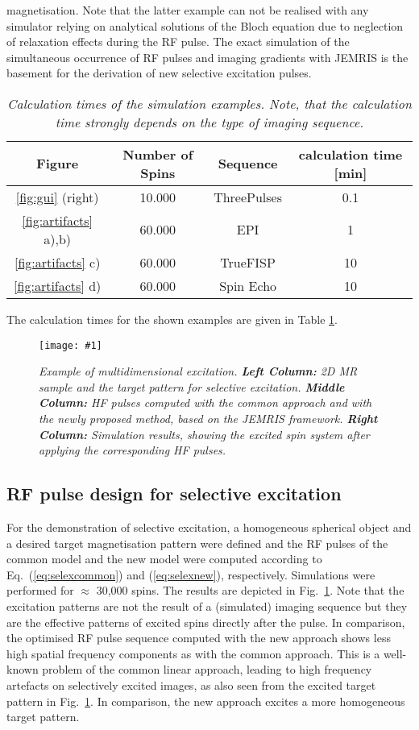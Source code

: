 \documentclass{nic-series}
\newcommand{\epsfigure}[5]{
 \begin{figure}[#4!]
   \begin{center}
    \texttt{[image: \#1]}
    \caption{{\sl #2}\label{#3}}
   \end{center}
 \end{figure}}
\begin{document}
magnetisation. Note that the latter example can not be realised with any simulator relying on analytical solutions of the Bloch
equation due to neglection of relaxation effects during the RF pulse. The exact simulation of the simultaneous occurrence of RF
pulses and imaging gradients with JEMRIS is the basement for the derivation of new selective excitation pulses.
\begin{small}
 \begin{table}[tp]
  {\footnotesize
  \begin{center}
  \begin{tabular}{|c|c|c|c|}
  \hline
        Figure & Number of Spins & Sequence & calculation time [min] \\
  \hline
	\ref{fig:gui} (right)    & 10.000     & ThreePulses & 0.1 \\
	\ref{fig:artifacts} a),b)& 60.000     & EPI         & 1 \\
	\ref{fig:artifacts} c)   & 60.000     & TrueFISP    & 10 \\
	\ref{fig:artifacts} d)   & 60.000     & Spin Echo   & 10 \\
  \hline
  \end{tabular}
  \end{center}
  }
  \caption{\label{tab:calctimes}
           {\it Calculation times of the simulation examples. Note, that the calculation time strongly depends
		on the type of imaging sequence.}}
 \end{table}
\end{small}
The calculation times for the shown examples are given in Table \ref{tab:calctimes}.
\epsfigure{fig/Selex.eps}{Example of multidimensional excitation. {\bf Left Column:} 2D MR sample and the target pattern for selective
			     excitation. {\bf Middle Column:} HF pulses computed with the common approach and with the newly proposed method,
			     based on the JEMRIS framework. {\bf Right Column:} Simulation results, showing the excited spin
			     system after applying the corresponding HF pulses.}{fig:selex}{bp}{0.7}
\subsection{RF pulse design for selective excitation}
For the demonstration of selective excitation, a homogeneous spherical object and a desired target
magnetisation pattern were defined and the RF pulses of the common model and the new model were computed
according to Eq.~(\ref{eq:selexcommon}) and (\ref{eq:selexnew}), respectively. Simulations were performed for $\approx$ 30,000 spins.
The results are depicted in Fig.~\ref{fig:selex}. Note that the excitation patterns are not the result of a (simulated) imaging sequence
but they are the effective patterns of excited spins directly after the pulse. In comparison, the optimised RF pulse
sequence computed with the new approach shows less high spatial frequency components as with the common
approach. This is a well-known problem of the common linear approach, leading to high frequency artefacts on
selectively excited images, as also seen from the excited target pattern in Fig.~\ref{fig:selex}. In comparison, the new approach
excites a more homogeneous target pattern.
\end{document}
